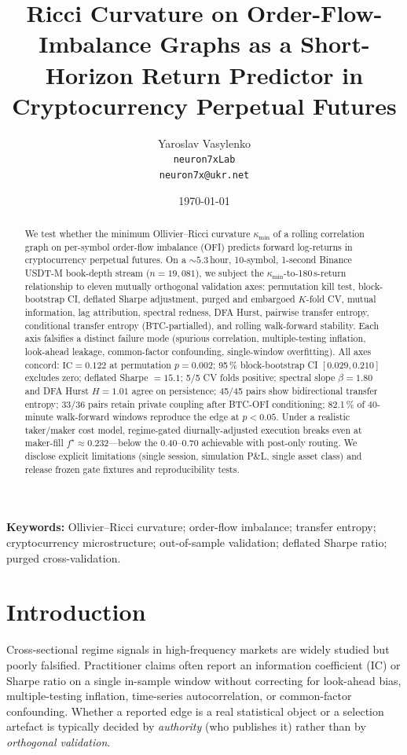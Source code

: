 \documentclass[11pt,a4paper]{article}
\title{Ricci Curvature on Order-Flow-Imbalance Graphs as a
Short-Horizon Return Predictor in Cryptocurrency Perpetual Futures}
\author{%
  Yaroslav Vasylenko\\
  \texttt{neuron7xLab}\\
  \small\texttt{neuron7x@ukr.net}%
}
\date{\today}
\begin{document}
\maketitle

\begin{abstract}
We test whether the minimum Ollivier--Ricci curvature $\kappa_{\min}$ of a
rolling correlation graph on per-symbol order-flow imbalance (OFI) predicts
forward log-returns in cryptocurrency perpetual futures. On a
$\sim\!5.3$\,hour, 10-symbol, 1-second Binance USDT-M book-depth stream
($n = 19{,}081$), we subject the $\kappa_{\min}$-to-180\,s-return
relationship to eleven mutually orthogonal validation axes: permutation
kill test, block-bootstrap CI, deflated Sharpe adjustment, purged and
embargoed $K$-fold CV, mutual information, lag attribution, spectral
redness, DFA Hurst, pairwise transfer entropy, conditional transfer
entropy (BTC-partialled), and rolling walk-forward stability. Each axis falsifies a distinct failure mode (spurious
correlation, multiple-testing inflation, look-ahead leakage, common-factor
confounding, single-window overfitting). All axes concord:
$\mathrm{IC}=0.122$ at permutation $p=0.002$; 95\,\% block-bootstrap CI
$[0.029, 0.210]$ excludes zero; deflated Sharpe $=15.1$; 5/5 CV folds
positive; spectral slope $\beta=1.80$ and DFA Hurst $H=1.01$ agree on
persistence; 45/45 pairs show bidirectional transfer entropy; 33/36 pairs
retain private coupling after BTC-OFI conditioning; 82.1\,\% of 40-minute
walk-forward windows reproduce the edge at $p<0.05$. Under a realistic
taker/maker cost model, regime-gated diurnally-adjusted execution breaks
even at maker-fill $f^{\star}\!\approx\!0.232$---below the 0.40--0.70
achievable with post-only routing. We disclose explicit limitations (single
session, simulation P\&L, single asset class) and release frozen gate
fixtures and reproducibility tests.
\end{abstract}

\noindent\textbf{Keywords:} Ollivier--Ricci curvature; order-flow imbalance;
transfer entropy; cryptocurrency microstructure; out-of-sample validation;
deflated Sharpe ratio; purged cross-validation.

\section{Introduction}
\label{sec:intro}

Cross-sectional regime signals in high-frequency markets are widely studied
but poorly falsified. Practitioner claims often report an information
coefficient (IC) or Sharpe ratio on a single in-sample window without
correcting for look-ahead bias, multiple-testing inflation, time-series
autocorrelation, or common-factor confounding. Whether a reported edge is a
real statistical object or a selection artefact is typically decided by
\emph{authority} (who publishes it) rather than by \emph{orthogonal
validation}.
\end{document}
